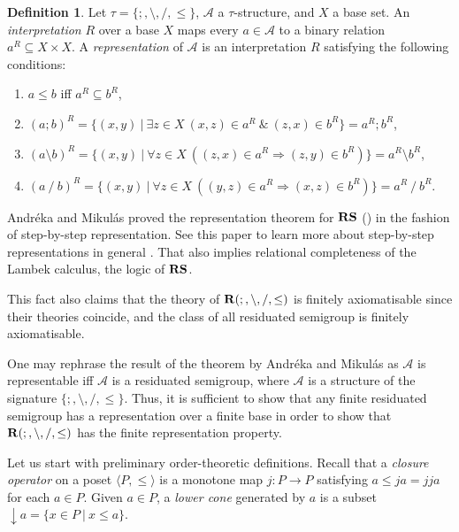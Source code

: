 \documentclass[a4paper]{article}
\theoremstyle{definition}
\newtheorem{definition}{Definition}
\theoremstyle{theorem}
\theoremstyle{proposition}
\theoremstyle{lemma}
\theoremstyle{ex}
\theoremstyle{corollary}
\theoremstyle{claim}
\begin{document}
\begin{definition}
  Let $\tau = \{ ;, \setminus, /, \leq \}$, $\mathcal{A}$ a $\tau$-structure, and $X$ a base set. An \emph{interpretation} $R$ over a base $X$ maps every $a \in \mathcal{A}$ to a binary relation $a^R \subseteq X \times X$. A \emph{representation} of $\mathcal{A}$ is an interpretation $R$ satisfying the following conditions:

  \begin{enumerate}
    \item $a \leq b$ iff $a^R \subseteq b^R$,
    \item $(a;b)^R = \{ (x, y) \: | \: \exists z \in X \: (x, z) \in a^R \: \& \: (z, x) \in b^R \} = a^R ; b^R$,
    \item $(a \setminus b)^{R} = \{ (x, y) \: | \: \forall z \in X \: ((z, x) \in a^R \Rightarrow (z, y) \in b^R)\} = a^R \setminus b^R$,
    \item $(a \: / \: b)^{R} = \{ (x, y) \: | \: \forall z \in X \: ((y, z) \in a^R \Rightarrow (x, z) \in b^R)\} = a^R \: / \: b^R$.
  \end{enumerate}
\end{definition}

Andr\'{e}ka and Mikul\'{a}s proved the representation theorem for ${\bf RS}$ (\cite{andreka1994lambek}) in the fashion of step-by-step representation. See this paper to learn more about step-by-step representations in general \cite{hirsch1997step}. That also implies relational completeness of the Lambek calculus, the logic of ${\bf RS}$.

This fact also claims that the theory of ${\bf R}(;, \setminus, /, \leq)$ is finitely axiomatisable since their theories coincide, and the class of all residuated semigroup is finitely axiomatisable.

One may rephrase the result of the theorem by Andr\'{e}ka and Mikul\'{a}s as $\mathcal{A}$ is representable iff $\mathcal{A}$ is a residuated semigroup, where $\mathcal{A}$ is a structure of the signature $\{ ;, \setminus, /, \leq \}$. Thus, it is sufficient to show that any finite residuated semigroup has a representation over a finite base in order to show that ${\bf R}(;, \setminus, /, \leq)$ has the finite representation property.

Let us start with preliminary order-theoretic definitions. Recall that a \emph{closure operator} on a poset $\langle P, \leq \rangle$ is a monotone map $j : P \to P$ satisfying $a \leq j a = j j a$ for each $a \in P$. Given $a \in P$, a \emph{lower cone} generated by $a$ is a subset $\downarrow a = \{ x \in P \: | \: x \leq a \}$.
\end{document}
